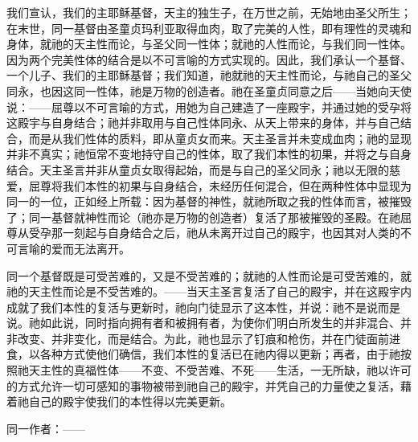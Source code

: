 我们宣认，我们的主耶稣基督，天主的独生子，在万世之前，无始地由圣父所生；在末世，同一基督由圣童贞玛利亚取得血肉，取了完美的人性，即有理性的灵魂和身体，就祂的天主性而论，与圣父同一性体；就祂的人性而论，与我们同一性体。因为两个完美性体的结合是以不可言喻的方式实现的。因此，我们承认一个基督、一个儿子、我们的主耶稣基督；我们知道，祂就祂的天主性而论，与祂自己的圣父同永，也因这同一性体，祂是万物的创造者。祂在圣童贞同意之后——当她向天使说：——屈尊以不可言喻的方式，用她为自己建造了一座殿宇，并通过她的受孕将这殿宇与自身结合；祂并非取用与自己性体同永、从天上带来的身体，并与自己结合，而是从我们性体的质料，即从童贞女而来。天主圣言并未变成血肉；祂的显现并非不真实；祂恒常不变地持守自己的性体，取了我们本性的初果，并将之与自身结合。天主圣言并非从童贞女取得起始，而是与自己的圣父同永；祂以无限的慈爱，屈尊将我们本性的初果与自身结合，未经历任何混合，但在两种性体中显现为同一的一位，正如经上所载：因为基督的神性，就祂所取之我的性体而言，被摧毁了；同一基督就神性而论（祂亦是万物的创造者）复活了那被摧毁的圣殿。在祂屈尊从受孕那一刻起与自身结合之后，祂从未离开过自己的殿宇，也因其对人类的不可言喻的爱而无法离开。\par

同一个基督既是可受苦难的，又是不受苦难的；就祂的人性而论是可受苦难的，就祂的天主性而论是不受苦难的。——当天主圣言复活了自己的殿宇，并在这殿宇内成就了我们本性的复活与更新时，祂向门徒显示了这本性，并说：祂不是说而是说。祂如此说，同时指向拥有者和被拥有者，为使你们明白所发生的并非混合、并非改变、并非变化，而是结合。为此，祂也显示了钉痕和枪伤，并在门徒面前进食，以各种方式使他们确信，我们本性的复活已在祂内得以更新；再者，由于祂按照祂天主性的真福性体——不变、不受苦难、不死——生活，一无所缺，祂以许可的方式允许一切可感知的事物被带到祂自己的殿宇，并凭自己的力量使之复活，藉着祂自己的殿宇使我们的本性得以完美更新。\par

\par

同一作者：——\par

